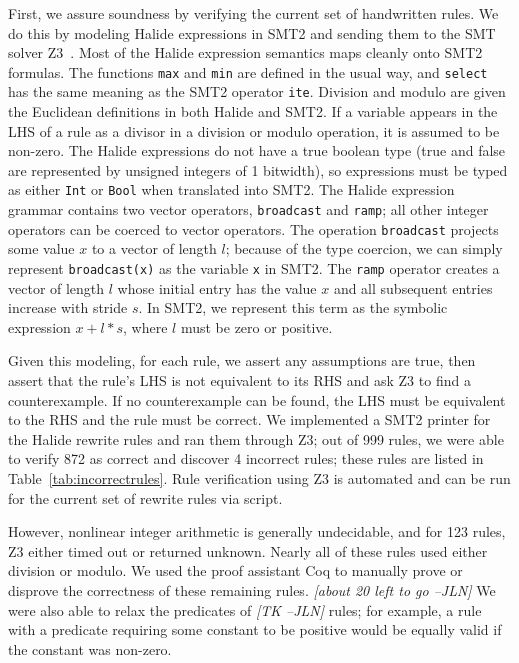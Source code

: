 \documentclass[sigplan,review,anonymous]{acmart}\settopmatter{printfolios=true,printccs=false,printacmref=false}
\newcommand{\jln}[1]{\textcolor{uwpurple}{\textit{[{#1} --JLN]}}}
\begin{document}
First, we assure soundness by verifying the current set of handwritten rules. We do this by modeling Halide expressions in SMT2 and sending them to the SMT solver Z3~\cite{de2008z3}. Most of the Halide expression semantics maps cleanly onto SMT2 formulas. The functions \texttt{max} and \texttt{min} are defined in the usual way, and \texttt{select} has the same meaning as the SMT2 operator \texttt{ite}. Division and modulo are given the Euclidean definitions in both Halide and SMT2. If a variable appears in the LHS of a rule as a divisor in a division or modulo operation, it is assumed to be non-zero. The Halide expressions do not have a true boolean type (true and false are represented by unsigned integers of 1 bitwidth), so expressions must be typed as either \texttt{Int} or \texttt{Bool} when translated into SMT2. The Halide expression grammar contains two vector operators, \texttt{broadcast} and \texttt{ramp}; all other integer operators can be coerced to vector operators. The operation \texttt{broadcast} projects some value $x$ to a vector of length $l$; because of the type coercion, we can simply represent \texttt{broadcast(x)} as the variable \texttt{x} in SMT2. The \texttt{ramp} operator creates a vector of length $l$ whose initial entry has the value $x$ and all subsequent entries increase with stride $s$. In SMT2, we represent this term as the symbolic expression $x + l * s$, where $l$ must be zero or positive.

Given this modeling, for each rule, we assert any assumptions are true, then assert that the rule's LHS is not equivalent to its RHS and ask Z3 to find a counterexample. If no counterexample can be found, the LHS must be equivalent to the RHS and the rule must be correct. We implemented a SMT2 printer for the Halide rewrite rules and ran them through Z3; out of 999 rules, we were able to verify 872 as correct and discover 4 incorrect rules; these rules are listed in Table~\ref{tab:incorrectrules}. Rule verification using Z3 is automated and can be run for the current set of rewrite rules via script.

However, nonlinear integer arithmetic is generally undecidable, and for 123 rules, Z3 either timed out or returned unknown. Nearly all of these rules used either division or modulo. We used the proof assistant Coq to manually prove or disprove the correctness of these remaining rules. \jln{about 20 left to go} We were also able to relax the predicates of \jln{TK} rules; for example, a rule with a predicate requiring some constant to be positive would be equally valid if the constant was non-zero.
\end{document}
